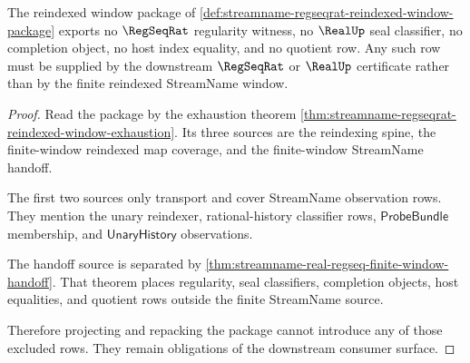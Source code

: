 \begin{theorem}
\label{thm:streamname-regseqrat-reindexed-window-no-seal-import}
The reindexed window package of
\autoref{def:streamname-regseqrat-reindexed-window-package} exports no
$\RegSeqRat$ regularity witness, no $\RealUp$ seal classifier, no completion
object, no host index equality, and no quotient row. Any such row must be
supplied by the downstream $\RegSeqRat$ or $\RealUp$ certificate rather than by
the finite reindexed StreamName window.
\end{theorem}
\begin{proof}
Read the package by the exhaustion theorem
\autoref{thm:streamname-regseqrat-reindexed-window-exhaustion}. Its three
sources are the reindexing spine, the finite-window reindexed map coverage,
and the finite-window StreamName handoff.

The first two sources only transport and cover StreamName observation rows.
They mention the unary reindexer, rational-history classifier rows,
$\mathsf{ProbeBundle}$ membership, and $\mathsf{UnaryHistory}$ observations.

The handoff source is separated by
\autoref{thm:streamname-real-regseq-finite-window-handoff}. That theorem
places regularity, seal classifiers, completion objects, host equalities, and
quotient rows outside the finite StreamName source.

Therefore projecting and repacking the package cannot introduce any of those
excluded rows. They remain obligations of the downstream consumer surface.
\end{proof}


